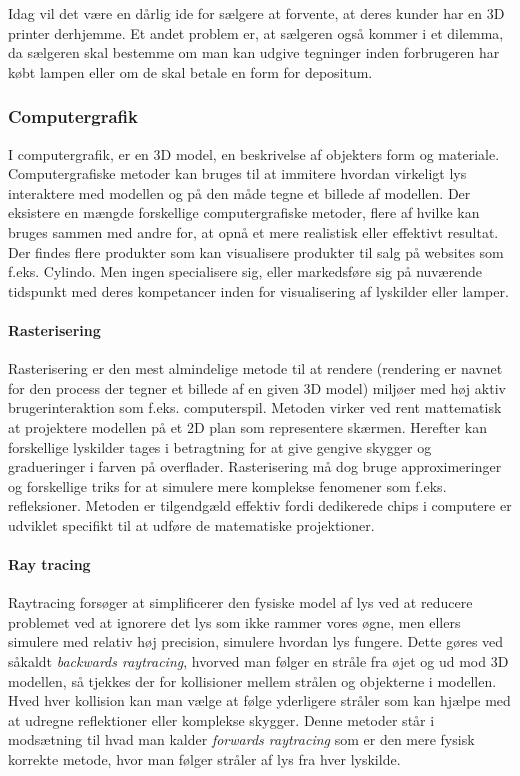 Idag vil det være en dårlig ide for sælgere at forvente, at deres kunder har en 3D printer derhjemme. Et andet problem er, at sælgeren også kommer i et dilemma, da sælgeren skal bestemme om man kan udgive tegninger inden forbrugeren har købt lampen eller om de skal betale en form for depositum.

\subsubsection{Computergrafik \cite{computergrafik_introduktion}}
I computergrafik, er en 3D model, en beskrivelse af objekters form og materiale. Computergrafiske metoder kan bruges til at immitere hvordan virkeligt lys interaktere med modellen og på den måde tegne et billede af modellen. Der eksistere en mængde forskellige computergrafiske metoder, flere af hvilke kan bruges sammen med andre for, at opnå et mere realistisk eller effektivt resultat. Der findes flere produkter som kan visualisere produkter til salg på websites som f.eks. Cylindo\cite{Cylindo}. Men ingen specialisere sig, eller markedsføre sig på nuværende tidspunkt med deres kompetancer inden for visualisering af lyskilder eller lamper.

\paragraph{Rasterisering}
Rasterisering er den mest almindelige metode til at rendere (rendering er navnet for den process der tegner et billede af en given 3D model) miljøer med høj aktiv brugerinteraktion som f.eks. computerspil. Metoden virker ved rent mattematisk at projektere modellen på et 2D plan som representere skærmen. Herefter kan forskellige lyskilder tages i betragtning for at give gengive skygger og gradueringer i farven på overflader. Rasterisering må dog bruge approximeringer og forskellige triks for at simulere mere komplekse fenomener som f.eks. refleksioner. Metoden er tilgendgæld effektiv fordi dedikerede chips i computere er udviklet specifikt til at udføre de matematiske projektioner.

\paragraph{Ray tracing \cite{raytracing_for_begyndere}}
Raytracing forsøger at simplificerer den fysiske model af lys ved at reducere problemet ved at ignorere det lys som ikke rammer vores øgne, men ellers simulere med relativ høj precision, simulere hvordan lys fungere. Dette gøres ved såkaldt \textit{backwards raytracing}, hvorved man følger en stråle fra øjet og ud mod 3D modellen, så tjekkes der for kollisioner mellem strålen og objekterne i modellen. Hved hver kollision kan man vælge at følge yderligere stråler som kan hjælpe med at udregne reflektioner eller komplekse skygger. Denne metoder står i modsætning til hvad man kalder \textit{forwards raytracing} som er den mere fysisk korrekte metode, hvor man følger stråler af lys fra hver lyskilde.

